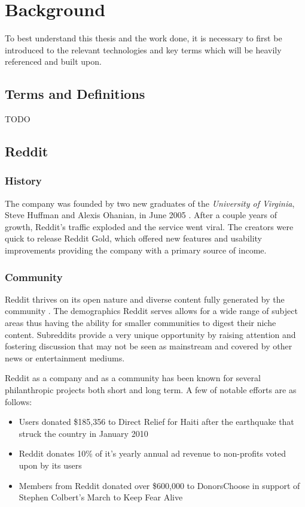 \documentclass[msc,oneside]{ubcthesis}%
\begin{document}
\chapter{Background}
To best understand this thesis and the work done, it is necessary to first be introduced to the relevant technologies and key terms which will be heavily referenced and built upon.

\section{Terms and Definitions}
TODO

\section{Reddit}

\subsection{History}
The company was founded by two new graduates of the \textit{University of Virginia}, Steve Huffman and Alexis Ohanian, in June 2005 \citep{Guardian}. After a couple years of growth, Reddit's traffic exploded and the service went viral. The creators were quick to release Reddit Gold, which offered new features and usability improvements providing the company with a primary source of income.

\subsection{Community}
Reddit thrives on its open nature and diverse content fully generated by the community \citep{Atlantic}. The demographics Reddit serves allows for a wide range of subject areas thus having the ability for smaller communities to digest their niche content. Subreddits provide a very unique opportunity by raising attention and fostering discussion that may not be seen as mainstream and covered by other news or entertainment mediums.
\par{}
Reddit as a company and as a community has been known for several philanthropic projects both short and long term. A few of notable efforts are as follows:
\begin{itemize}
\item{Users donated \$185,356 to Direct Relief for Haiti after the earthquake that struck the country in January 2010}
\item{Reddit donates 10\% of it's yearly annual ad revenue to non-profits voted upon by its users \citep{RedditBlog}}
\item{Members from Reddit donated over \$600,000 to DonorsChoose in support of Stephen Colbert's March to Keep Fear Alive \citep{DonorsChoose}}
\end{itemize}
\end{document}
